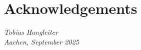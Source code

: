 \chapter*{Acknowledgements}

\begin{flushright}
    \itshape
    Tobias Hangleiter\\
    Aachen, September 2025
\end{flushright}
